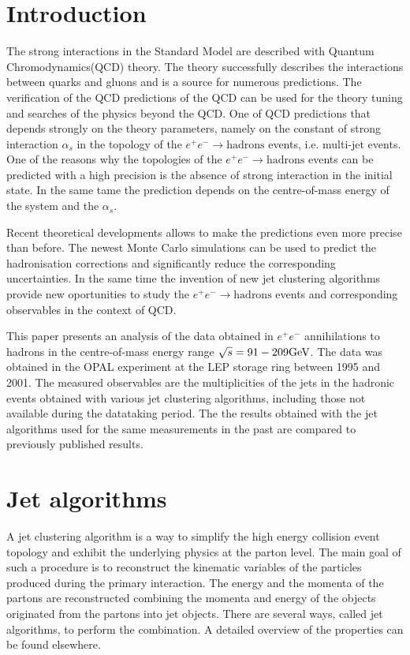 \newpage
\section{Introduction}
\label{sec:introduction}
The strong interactions  in the Standard Model are described 
with Quantum Chromodynamics(QCD) theory. 
The theory successfully describes 
the interactions between quarks and gluons and is a source for numerous 
predictions. The verification of the QCD predictions of the QCD can
be used for the theory tuning and searches of the physics beyond the 
QCD.
One of QCD predictions that depends strongly on the theory parameters, namely on the constant of strong interaction $\alpha_s$ 
in the topology of the $e^+e^-\rightarrow \text{hadrons}$ events, i.e. multi-jet events. One of the reasons why the
topologies of the $e^+e^-\rightarrow \text{hadrons}$ events can be predicted with a high
precision is the absence of  strong interaction in the initial state. In the same tame the prediction depends on the 
centre-of-mass energy of the system and the $\alpha_s$.

Recent theoretical developments 
allows to make the predictions even more precise than before. %
The newest Monte Carlo simulations can be used to predict the 
hadronisation corrections and significantly reduce the corresponding uncertainties.%
In the same time the invention of new jet clustering algorithms provide new
 oportunities to study the $e^+e^-\rightarrow \text{hadrons}$ events and 
 corresponding observables in the context of QCD.

This paper presents an analysis of the data obtained in $e^+e^-$ 
annihilations to hadrons in the centre-of-mass energy range 
$\sqrt{s}=91-209{\text{Ge}\kern-0.06667em\text{V\/}}$. The data was obtained in the OPAL experiment 
at the LEP storage ring between 1995 and  2001. 
The measured observables are the multiplicities of the jets in the 
hadronic events obtained with various jet clustering algorithms,
including those not available during the datataking period.
The the results  obtained with the jet algorithms used for the same measurements
in the past are compared to previously published results.



\section{Jet algorithms}
\label{sec:algorithms}
A jet clustering algorithm is a way to simplify the high energy collision event topology 
 and exhibit the underlying physics at the parton level. The main goal of such a procedure is to
 reconstruct the kinematic variables of the particles produced during the primary interaction.
 The energy and the momenta of the partons are reconstructed combining the 
 momenta and energy of the objects originated from the partons into jet objects.
 There are several ways, called jet algorithms,
  to perform the combination. A detailed overview of the properties can be found elsewhere.
 
